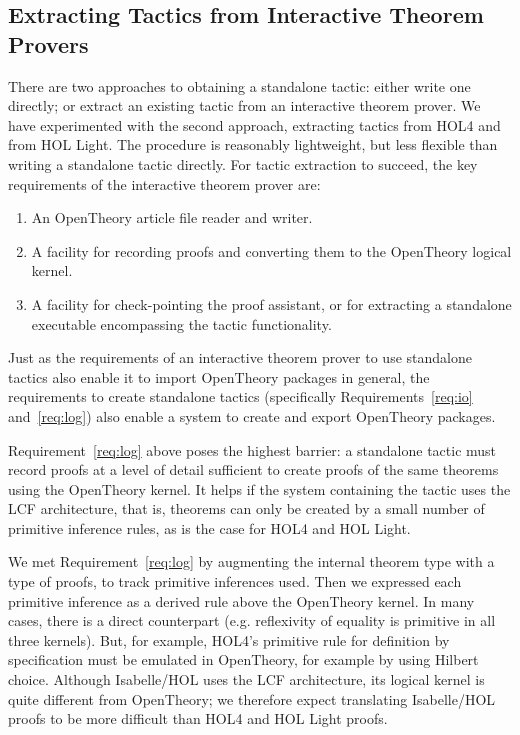 \documentclass{llncs}
\newcommand{\OpenTheory}{OpenTheory\xspace}
\newcommand{\eg}{e.g.\xspace}
\begin{document}
\subsection{Extracting Tactics from Interactive Theorem Provers}

There are two approaches to obtaining a standalone tactic: either write one directly; or extract an existing tactic from an interactive theorem prover.
We have experimented with the second approach, extracting tactics from HOL4 and from HOL Light.
The procedure is reasonably lightweight, but less flexible than writing a standalone tactic directly.
For tactic extraction to succeed, the key requirements of the interactive theorem prover are:
\begin{enumerate}
\item\label{req:io} An \OpenTheory article file reader and writer.

\item\label{req:log} A facility for recording proofs and converting them to the \OpenTheory logical kernel.

\item\label{req:ckpt} A facility for check-pointing the proof assistant, or for extracting a standalone executable encompassing the tactic functionality.
\end{enumerate}

Just as the requirements of an interactive theorem prover to use standalone tactics also enable it to import \OpenTheory packages in general, the requirements to create standalone tactics (specifically Requirements~\ref{req:io} and~\ref{req:log}) also enable a system to create and export \OpenTheory packages.

Requirement~\ref{req:log} above poses the highest barrier: a standalone tactic must record proofs at a level of detail sufficient to create proofs of the same theorems using the \OpenTheory kernel.
It helps if the system containing the tactic uses the LCF architecture, that is, theorems can only be created by a small number of primitive inference rules, as is the case for HOL4 and HOL Light.

We met Requirement~\ref{req:log} by augmenting the internal theorem type with a type of proofs, to track primitive inferences used.
Then we expressed each primitive inference as a derived rule above the \OpenTheory kernel.
In many cases, there is a direct counterpart (\eg reflexivity of equality is primitive in all three kernels).
But, for example, HOL4's primitive rule for definition by specification must be emulated in \OpenTheory, for example by using Hilbert choice.
Although Isabelle/HOL uses the LCF architecture, its logical kernel is quite different from \OpenTheory; we therefore expect translating Isabelle/HOL proofs to be more difficult than HOL4 and HOL Light proofs.
\end{document}
